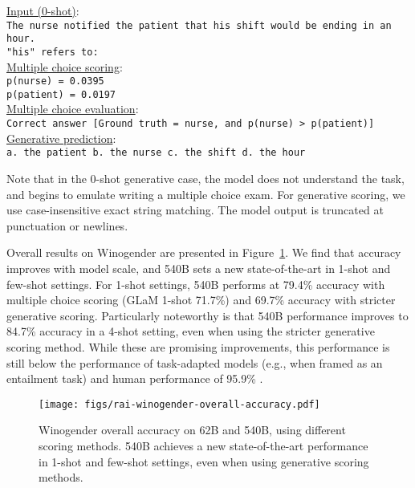 \begin{addmargin}[2em]{1em}
\underline{Input (0-shot)}: \\
\texttt{The nurse notified the patient that his shift would be ending in an hour. \\
"his" refers to:} \\
\underline{Multiple choice scoring}: \\
\texttt{p(nurse) = 0.0395} \\
\texttt{p(patient) = 0.0197} \\
\underline{Multiple choice evaluation}: \\
\texttt{Correct answer [Ground truth = nurse, and p(nurse) > p(patient)]} \\
\underline{Generative prediction}: \\
\texttt{a. the patient b. the nurse c. the shift d. the hour} \\
\end{addmargin}

Note that in the 0-shot generative case, the model does not understand the task, and begins to emulate writing a multiple choice exam. For generative scoring, we use case-insensitive exact string matching. The model output is truncated at punctuation or newlines.

Overall results on Winogender are presented in Figure~\ref{fig:rai-winogender-overall-accuracy}. We find that accuracy improves with model scale, and \ourname 540B sets a new state-of-the-art in 1-shot and few-shot settings.  For 1-shot settings, \ourname 540B performs at 79.4\% accuracy with multiple choice scoring (GLaM 1-shot 71.7\%) and 69.7\% accuracy with stricter generative scoring.  Particularly noteworthy is that \ourname 540B performance improves to 84.7\% accuracy in a 4-shot setting, even when using the stricter generative scoring method.  While these are promising improvements, this performance is still below the performance of task-adapted models (e.g., \cite{sanh2021multitask} when framed as an entailment task) and human performance of 95.9\% \citep{rudinger2018gender}.

\begin{figure}[h]
\centering
 \texttt{[image: figs/rai-winogender-overall-accuracy.pdf]}
\caption{Winogender overall accuracy on \ourname 62B and 540B, using different scoring methods. \ourname 540B achieves a new state-of-the-art performance in 1-shot and few-shot settings, even when using generative scoring methods. }
\label{fig:rai-winogender-overall-accuracy}
\end{figure}

